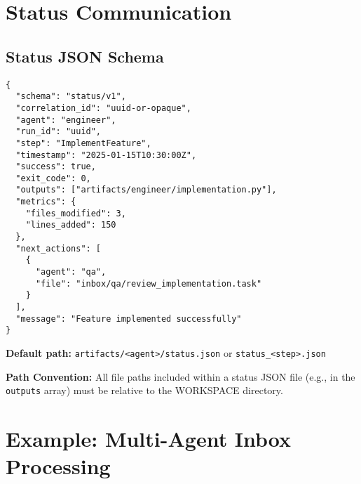 \documentclass[11pt,a4paper]{article}
\begin{document}
\section{Status Communication}

\subsection{Status JSON Schema}

\begin{lstlisting}[caption={Status JSON Schema}]
{
  "schema": "status/v1",
  "correlation_id": "uuid-or-opaque",
  "agent": "engineer",
  "run_id": "uuid",
  "step": "ImplementFeature",
  "timestamp": "2025-01-15T10:30:00Z",
  "success": true,
  "exit_code": 0,
  "outputs": ["artifacts/engineer/implementation.py"],
  "metrics": {
    "files_modified": 3,
    "lines_added": 150
  },
  "next_actions": [
    {
      "agent": "qa",
      "file": "inbox/qa/review_implementation.task"
    }
  ],
  "message": "Feature implemented successfully"
}
\end{lstlisting}

\textbf{Default path:} \texttt{artifacts/<agent>/status.json} or \texttt{status\_<step>.json}

\textbf{Path Convention:} All file paths included within a status JSON file (e.g., in the \texttt{outputs} array) must be relative to the WORKSPACE directory.

\section{Example: Multi-Agent Inbox Processing}
\end{document}
